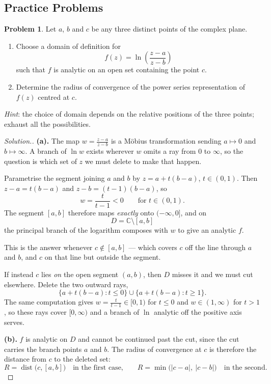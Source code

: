 \documentclass[11pt,a4paper]{article}
\theoremstyle{definition}
\newtheorem{problemx}{Problem}[section]
\newenvironment{problem}{\begin{problemx}}{\end{problemx}}
\newenvironment{solution}
  {\renewcommand{\qedsymbol}{}\begin{proof}[\textit{Solution}.]}
  {\end{proof}}
\begin{document}
{\color[wave]{485}\subsection{Practice Problems}}

\begin{problem}
Let $a$, $b$ and $c$ be any three distinct points of the complex plane.
\begin{enumerate}
\item[(a).] Choose a domain of definition for
$$f(z) = \ln\left(\frac{z - a}{z - b}\right)$$
such that $f$ is analytic on an open set containing the point $c$.
\item[(b).] Determine the radius of convergence of the power series
representation of $f(z)$ centred at $c$.
\end{enumerate}
\textit{Hint}: the choice of domain depends on the relative positions of the
three points; exhaust all the possibilities.
\end{problem}

\begin{solution}
\textbf{(a).} The map $w = \frac{z-a}{z-b}$ is a M\"obius transformation sending
$a \mapsto 0$ and $b \mapsto \infty$. A branch of $\ln w$ exists wherever $w$
omits a ray from $0$ to $\infty$, so the question is which set of $z$ we must
delete to make that happen.

Parametrise the segment joining $a$ and $b$ by $z = a + t(b-a)$, $t \in (0,1)$.
Then $z - a = t(b-a)$ and $z - b = (t-1)(b-a)$, so
$$w = \frac{t}{t-1} < 0 \qquad\text{for } t \in (0,1).$$
The segment $[a,b]$ therefore maps \emph{exactly} onto $(-\infty, 0]$, and on
$$D = \mathbb{C} \setminus [a,b]$$
the principal branch of the logarithm composes with $w$ to give an analytic $f$.

This is the answer whenever $c \notin [a,b]$ --- which covers $c$ off the line
through $a$ and $b$, and $c$ on that line but outside the segment.

If instead $c$ lies \emph{on} the open segment $(a,b)$, then $D$ misses it and we
must cut elsewhere. Delete the two outward rays,
$$\{a + t(b-a) : t \leq 0\} \cup \{a + t(b-a) : t \geq 1\}.$$
The same computation gives $w = \frac{t}{t-1} \in [0,1)$ for $t \leq 0$ and
$w \in (1,\infty)$ for $t > 1$, so these rays cover $[0,\infty)$ and a branch of
$\ln$ analytic off the positive axis serves.

\textbf{(b).} $f$ is analytic on $D$ and cannot be continued past the cut, since
the cut carries the branch points $a$ and $b$. The radius of convergence at $c$
is therefore the distance from $c$ to the deleted set:
$$R = \operatorname{dist}\big(c, [a,b]\big)
\quad\text{in the first case,}\qquad
R = \min\big(\left|c-a\right|,\ \left|c-b\right|\big)
\quad\text{in the second.}$$
\end{solution}
\end{document}
